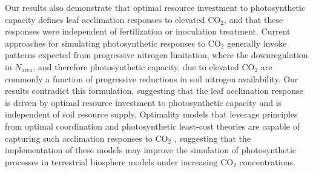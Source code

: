 Our results also demonstrate that optimal resource investment to photosynthetic capacity defines leaf acclimation responses to elevated CO$_2$, and that these responses were independent of fertilization or inoculation treatment. Current approaches for simulating photosynthetic responses to CO$_2$ generally invoke patterns expected from progressive nitrogen limitation, where the downregulation in $N_\mathrm{area}$, and therefore photosynthetic capacity, due to elevated CO$_2$ are commonly a function of progressive reductions in soil nitrogen availability. Our results contradict this formulation, suggesting that the leaf acclimation response is driven by optimal resource investment to photosynthetic capacity and is independent of soil resource supply. Optimality models that leverage principles from optimal coordination and photosynthetic least-cost theories  are capable of capturing such acclimation responses to CO$_2$ , suggesting that the implementation of these models may improve the simulation of photosynthetic processes in terrestrial biosphere models under increasing CO$_2$ concentrations.

